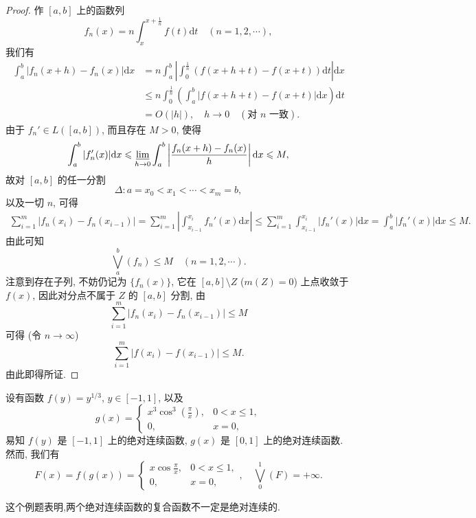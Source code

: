 \documentclass[../../main.tex]{subfiles}%
\begin{document}
\begin{proof}
作 $[a,b]$ 上的函数列
\[
f_n(x) = n\int_x^{x+\frac{1}{n}} f(t)\mathrm{d}t\quad (n=1,2,\cdots),
\]
我们有
\begin{align*}
\int_a^b |f_n(x+h)-f_n(x)|\mathrm{d}x
&= n\int_a^b \left|\int_0^{\frac{1}{n}} (f(x+h+t)-f(x+t))\mathrm{d}t\right|\mathrm{d}x \\
&\leqslant n\int_0^{\frac{1}{n}} \left(\int_a^b |f(x+h+t)-f(x+t)|\mathrm{d}x\right)\mathrm{d}t \\
&= O(|h|),\quad h\to 0 \quad (\text{对 } n \text{ 一致}).
\end{align*}
由于 $f_n'\in L([a,b])$, 而且存在 $M>0$, 使得
\[
\int_a^b |f_n'(x)|\mathrm{d}x \leqslant \varliminf_{h\to 0} \int_a^b \left|\frac{f_n(x+h)-f_n(x)}{h}\right|\mathrm{d}x \leqslant M,
\]
故对 $[a,b]$ 的任一分割
\[
\Delta: a = x_0 < x_1 < \cdots < x_m = b,
\]
以及一切 $n$, 可得
\begin{align*}
\sum_{i=1}^m |f_n(x_i)-f_n(x_{i-1})| = \sum_{i=1}^m \left|\int_{x_{i-1}}^{x_i} f_n'(x)\mathrm{d}x\right| 
\leqslant \sum_{i=1}^m \int_{x_{i-1}}^{x_i} |f_n'(x)|\mathrm{d}x = \int_a^b |f_n'(x)|\mathrm{d}x \leqslant M.
\end{align*}
由此可知
\[
\bigvee_a^b(f_n) \leqslant M\quad (n=1,2,\cdots).
\]
注意到存在子列, 不妨仍记为 $\{f_n(x)\}$, 它在 $[a,b]\setminus Z$ ($m(Z)=0$) 上点收敛于 $f(x)$, 因此对分点不属于 $Z$ 的 $[a,b]$ 分割, 由
\[
\sum_{i=1}^m |f_n(x_i)-f_n(x_{i-1})| \leqslant M
\]
可得 (令 $n\to\infty$)
\[
\sum_{i=1}^m |f(x_i)-f(x_{i-1})| \leqslant M.
\]
由此即得所证.
\end{proof}

\begin{example}
设有函数 $f(y)=y^{1/3}$, $y\in[-1,1]$, 以及
\[
g(x) =
\begin{cases}
x^3\cos^3(\frac{\pi}{x}), & 0<x\leqslant 1, \\
0, & x=0,
\end{cases}
\]
易知 $f(y)$ 是 $[-1,1]$ 上的绝对连续函数, $g(x)$ 是 $[0,1]$ 上的绝对连续函数. 然而, 我们有
\[
F(x) = f(g(x)) =
\begin{cases}
x\cos\frac{\pi}{x}, & 0<x\leqslant 1, \\
0, & x=0,
\end{cases},
\quad \bigvee_0^1(F) = +\infty.
\]
\end{example}
\begin{remark}
这个例题表明,两个绝对连续函数的复合函数不一定是绝对连续的.
\end{remark} 
\end{document}
